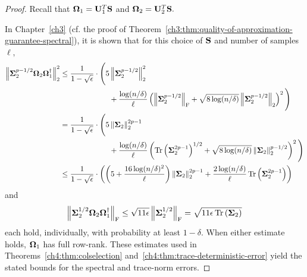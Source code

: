 \begin{proof}
Recall that $\mathbf{\Omega}_1 = \mathbf{U}_1^T
\mathbf{S}$ and $\mathbf{\Omega}_2 = \mathbf{U}_2^T \mathbf{S}.$

In Chapter~\ref{ch3} (cf. the proof of Theorem~\ref{ch3:thm:quality-of-approximation-guarantee-spectral}), 
it is shown that for this choice of $\mathbf{S}$ and number of samples $\ell,$ 
\begin{align*}
 \TNormS{\matSig_2^{p-1/2} \matOmega_2 \matOmega_1^\pinv} & 
         \leq \frac{1}{1 - \sqrt{\epsilon}} \cdot 
         \Bigg( 5 \TNormS{\matSig_2^{p-1/2}}  \\
         &\hspace{23mm} + 
        \frac{\log(n/\delta)}{\ell} \left(\FNorm{\matSig_2^{p-1/2}} + 
        \sqrt{8 \log(n/\delta)}\TNorm{\matSig_2^{p-1/2}} \right)^2 \Bigg) \\
  & = \frac{1}{1 - \sqrt{\epsilon}} \cdot 
       \Bigg( 5 \TNorm{\matSig_2}^{2p-1} \\
        &\hspace{23mm} + 
       \frac{\log(n/\delta)}{\ell} \left(\tracenorm{\matSig_2^{2p-1}}^{1/2} + 
          \sqrt{8 \log(n/\delta)}\TNorm{\matSig_2}^{p-1/2} \right)^2 \Bigg) \\
  & \leq \frac{1}{1 - \sqrt{\epsilon}} \cdot 
    \left( \left(5 + \frac{16 \log(n/\delta)^2}{\ell}\right) 
    \TNorm{\matSig_2}^{2p-1} + 
    \frac{2 \log(n/\delta)}{\ell} \tracenorm{\matSig_2^{2p-1}} \right)
  \end{align*}
and
\[
 \left\|\mathbf{\Sigma}_2^{1/2} \mathbf{\Omega}_2 \mathbf{\Omega}_1^\dagger\right\|_\mathrm{F} \leq 
 \sqrt{11 \epsilon} \left\|\mathbf{\Sigma}_2^{1/2}\right\|_\mathrm{F} 
 = \sqrt{11 \epsilon \operatorname{Tr}\left(\mathbf{\Sigma}_2\right)}
\]
each hold, individually, with probability at least $1 - \delta.$ When either
estimate holds, $\mathbf{\Omega}_1$ has full row-rank.
These estimates used in 
Theorems~\ref{ch4:thm:colselection}
and~\ref{ch4:thm:trace-deterministic-error}
yield the stated bounds for the spectral and trace-norm errors. 


\end{proof}

